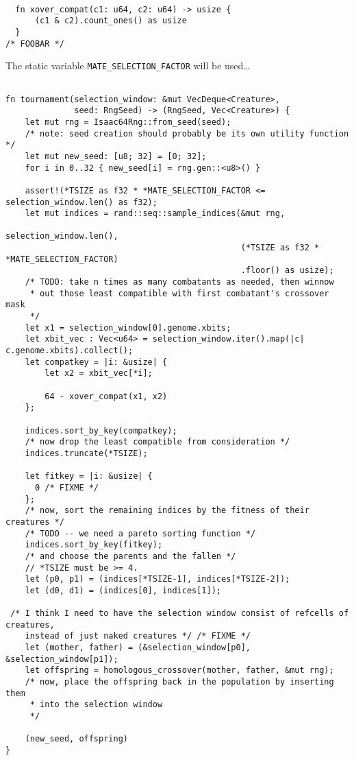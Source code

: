 \documentclass[11pt]{article}
\begin{document}
\lstset{language=rust,label=org2c52567,caption= ,captionpos=b,numbers=none}
\begin{lstlisting}

  fn xover_compat(c1: u64, c2: u64) -> usize {
      (c1 & c2).count_ones() as usize
  }
/* FOOBAR */
\end{lstlisting}

The static variable \texttt{MATE\_SELECTION\_FACTOR} will be used\ldots{}

\lstset{language=rust,label=orgef13ddd,caption= ,captionpos=b,numbers=none}
\begin{lstlisting}

fn tournament(selection_window: &mut VecDeque<Creature>,
              seed: RngSeed) -> (RngSeed, Vec<Creature>) {
    let mut rng = Isaac64Rng::from_seed(seed);
    /* note: seed creation should probably be its own utility function */
    let mut new_seed: [u8; 32] = [0; 32];
    for i in 0..32 { new_seed[i] = rng.gen::<u8>() }

    assert!(*TSIZE as f32 * *MATE_SELECTION_FACTOR <= selection_window.len() as f32);
    let mut indices = rand::seq::sample_indices(&mut rng,
                                                selection_window.len(),
                                                (*TSIZE as f32 * *MATE_SELECTION_FACTOR)
                                                .floor() as usize);
    /* TODO: take n times as many combatants as needed, then winnow
     * out those least compatible with first combatant's crossover mask
     */
    let x1 = selection_window[0].genome.xbits;
    let xbit_vec : Vec<u64> = selection_window.iter().map(|c| c.genome.xbits).collect();
    let compatkey = |i: &usize| {
        let x2 = xbit_vec[*i];

        64 - xover_compat(x1, x2)
    };

    indices.sort_by_key(compatkey);
    /* now drop the least compatible from consideration */
    indices.truncate(*TSIZE);

    let fitkey = |i: &usize| {
      0 /* FIXME */
    };
    /* now, sort the remaining indices by the fitness of their creatures */
    /* TODO -- we need a pareto sorting function */
    indices.sort_by_key(fitkey);
    /* and choose the parents and the fallen */
    // *TSIZE must be >= 4.
    let (p0, p1) = (indices[*TSIZE-1], indices[*TSIZE-2]);
    let (d0, d1) = (indices[0], indices[1]);

 /* I think I need to have the selection window consist of refcells of creatures, 
    instead of just naked creatures */ /* FIXME */ 
    let (mother, father) = (&selection_window[p0], &selection_window[p1]);
    let offspring = homologous_crossover(mother, father, &mut rng);
    /* now, place the offspring back in the population by inserting them
     * into the selection window
     */

    (new_seed, offspring)
}
\end{lstlisting}
\end{document}
